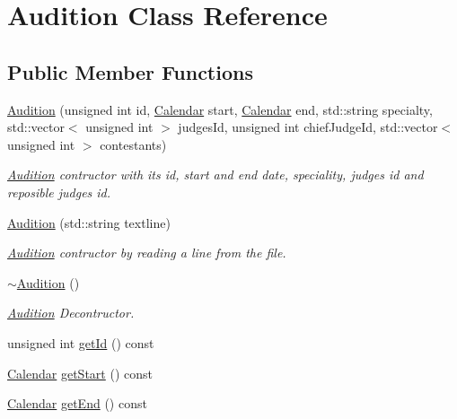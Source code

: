 \hypertarget{class_audition}{}\section{Audition Class Reference}
\label{class_audition}
\subsection*{Public Member Functions}
\begin{DoxyCompactItemize}
\item 
\hyperlink{class_audition_aba9121b34d5f4064cefee6afa099bfa8}{Audition} (unsigned int id, \hyperlink{class_calendar}{Calendar} start, \hyperlink{class_calendar}{Calendar} end, std\+::string specialty, std\+::vector$<$ unsigned int $>$ judges\+Id, unsigned int chief\+Judge\+Id, std\+::vector$<$ unsigned int $>$ contestants)
\begin{DoxyCompactList}\small\item\em \hyperlink{class_audition}{Audition} contructor with its id, start and end date, speciality, judges\textquotesingle{} id and reposible judge\textquotesingle{}s id. \end{DoxyCompactList}\item 
\hyperlink{class_audition_aac285f2a39b091a92f86f221f2e4f040}{Audition} (std\+::string textline)
\begin{DoxyCompactList}\small\item\em \hyperlink{class_audition}{Audition} contructor by reading a line from the file. \end{DoxyCompactList}\item 
\mbox{\label{class_audition_a832a8c4db2225a54852546bae369b7d8}} 
\hyperlink{class_audition_a832a8c4db2225a54852546bae369b7d8}{$\sim$\+Audition} ()
\begin{DoxyCompactList}\small\item\em \hyperlink{class_audition}{Audition} Decontructor. \end{DoxyCompactList}\item 
unsigned int \hyperlink{class_audition_a938690d2670e525b808a6ba4aa485877}{get\+Id} () const
\item 
\hyperlink{class_calendar}{Calendar} \hyperlink{class_audition_ac4fc745ecaa9e6975dab7ed779d732d0}{get\+Start} () const
\item 
\hyperlink{class_calendar}{Calendar} \hyperlink{class_audition_aed384fcdc7ec6567c102b489bcf8c6aa}{get\+End} () const

\end{DoxyCompactItemize}
